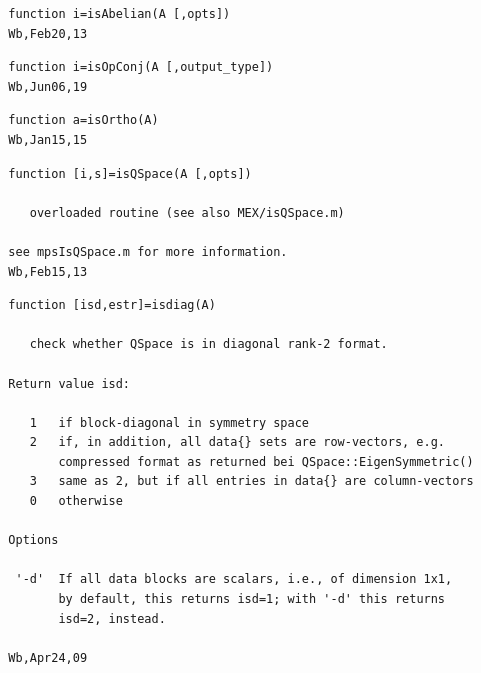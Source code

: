 \documentclass[twoside,12pt]{article}
\begin{document}
\pagebreak[3]



\begin{verbatim}
  function i=isAbelian(A [,opts])
  Wb,Feb20,13
\end{verbatim}

\pagebreak[3]



\begin{verbatim}
  function i=isOpConj(A [,output_type])
  Wb,Jun06,19
\end{verbatim}

\pagebreak[3]



\begin{verbatim}
  function a=isOrtho(A)
  Wb,Jan15,15
\end{verbatim}

\pagebreak[3]



\begin{verbatim}
  function [i,s]=isQSpace(A [,opts])
 
     overloaded routine (see also MEX/isQSpace.m)
 
  see mpsIsQSpace.m for more information.
  Wb,Feb15,13
\end{verbatim}

\pagebreak[3]



\begin{verbatim}
  function [isd,estr]=isdiag(A)
 
     check whether QSpace is in diagonal rank-2 format.
 
  Return value isd:
 
     1   if block-diagonal in symmetry space
     2   if, in addition, all data{} sets are row-vectors, e.g.
         compressed format as returned bei QSpace::EigenSymmetric()
     3   same as 2, but if all entries in data{} are column-vectors
     0   otherwise
 
  Options
 
   '-d'  If all data blocks are scalars, i.e., of dimension 1x1,
         by default, this returns isd=1; with '-d' this returns
         isd=2, instead.
 
  Wb,Apr24,09
\end{verbatim}

\pagebreak[3]
\end{document}
